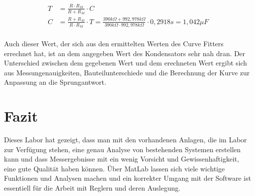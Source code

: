 \documentclass{report}
\begin{document}
\begin{eqnarray}
  T &= \frac{R\cdot R_M}{R+R_M}\cdot C  \\
  C &= \frac{R+R_M}{R\cdot R_M}\cdot T = \frac{390k\Omega + 992,978k\Omega}{390k\Omega \cdot 992,978k\Omega} \cdot 0,2918s = 1,042\mu F\\
  \label{eq:kondensator_ueberpruefen}
\end{eqnarray}

Auch dieser Wert, der sich aus den ermittelten Werten des Curve Fitters errechnet hat, ist an dem angegeben Wert des Kondensators sehr nah dran. Der Unterschied zwischen dem gegebenen Wert und dem erechneten Wert ergibt sich aus Messungenauigkeiten, Bauteilunterschiede und die Berechnung der Kurve zur Anpassung an die Sprungantwort.

\section{Fazit}
\label{sec:fazit}

Dieses Labor hat gezeigt, dass man mit den vorhandenen Anlagen, die im Labor zur Verfügung stehen, eine genau Analyse von bestehenden Systemen erstellen kann und dass Messergebnisse mit ein wenig Vorsicht und Gewissenhaftigkeit, eine gute Qualität haben können. Über MatLab lassen sich viele wichtige Funktionen und Analysen machen und ein korrekter Umgang mit der Software ist essentiell für die Arbeit mit Reglern und deren Auslegung.
\end{document}
